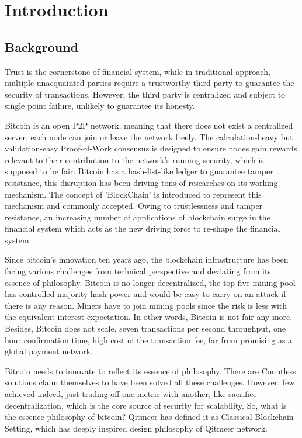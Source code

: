 \documentclass[a4paper,11pt]{article}
\begin{document}
\section{Introduction}

\subsection{Background}
Trust is the cornerstone of financial system, while in traditional approach, multiple unacquainted parties require a trustworthy third party to guarantee the security of transactions. However, the third party is centralized and subject to single point failure, unlikely to guarantee its honesty.

Bitcoin is an open P2P network, meaning that there does not exist a centralized server, each node can join or leave the network freely. The calculation-heavy but validation-easy Proof-of-Work consensus is designed to ensure nodes gain rewards relevant to their contribution to the network’s running security, which is supposed to be fair. Bitcoin has a hash-list-like ledger to guarantee tamper resistance, this disruption has been driving tons of researches on its working mechanism. The concept of ’BlockChain’ is introduced to represent this mechanism and commonly accepted. Owing to trustlessness and tamper resistance, an increasing number of applications of blockchain surge in the financial system which acts as the new driving force to re-shape the financial system.

Since bitcoin's innovation ten years ago, the blockchain infrastructure has been facing various challenges from technical perspective and  deviating from its essence of philosophy. Bitcoin is no longer decentralized, the top five mining pool has controlled majority hash power and would be easy to carry on an attack if there is any reason. Miners have to join mining pools since the risk is less with the equivalent interest expectation. In other words, Bitcoin is not fair any more. Besides, Bitcoin does not scale, seven transactions per second throughput, one hour confirmation time, high cost of the transaction fee, far from promising as a global payment network. 

Bitcoin needs to innovate to reflect its essence of philosophy. There are Countless solutions claim themselves to have been solved all these challenges. However, few achieved indeed, just trading off one metric with another, like sacrifice decentralization, which is the core source of security for scalability. So, what is the essence philosophy of bitcoin? Qitmeer has defined it as Classical Blockchain Setting, which has deeply inspired design philosophy of Qitmeer network.
\end{document}
